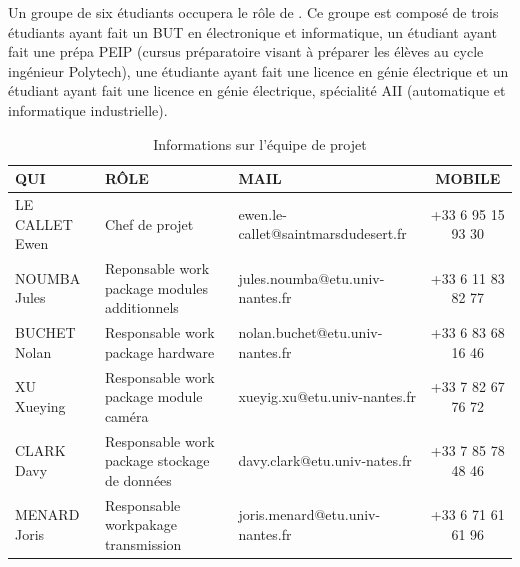\newpage
Un groupe de six étudiants occupera le rôle de .
Ce groupe est composé de trois étudiants ayant fait un BUT en électronique et informatique, un étudiant ayant fait une prépa PEIP (cursus préparatoire visant à préparer les élèves au cycle ingénieur Polytech), une étudiante ayant fait une licence en génie électrique et un étudiant ayant fait une licence en génie électrique, spécialité AII (automatique et informatique industrielle). \\[15pt]

\begin{table}[h!]
    \centering
    \renewcommand{\arraystretch}{1.2} %
    \begin{tabular}{|m{2.5cm}|m{5cm}|m{5cm}|c|}
        \hline
        \textbf{QUI}   & \textbf{RÔLE}                                & \textbf{MAIL}                       & \textbf{MOBILE}   \\
        \hline
        LE CALLET Ewen & Chef de projet                               & ewen.le-callet@saintmarsdudesert.fr & +33 6 95 15 93 30 \\
        \hline
        NOUMBA Jules   & Reponsable work package modules additionnels & jules.noumba@etu.univ-nantes.fr     & +33 6 11 83 82 77 \\
        \hline
        BUCHET Nolan   & Responsable work package hardware            & nolan.buchet@etu.univ-nantes.fr     & +33 6 83 68 16 46 \\
        \hline
        XU Xueying     & Responsable work package module caméra       & xueyig.xu@etu.univ-nantes.fr        & +33 7 82 67 76 72 \\
        \hline
        CLARK Davy     & Responsable work package stockage de données & davy.clark@etu.univ-nates.fr        & +33 7 85 78 48 46 \\
        \hline
        MENARD Joris   & Responsable workpakage transmission          & joris.menard@etu.univ-nantes.fr     & +33 6 71 61 61 96 \\
        \hline
    \end{tabular}
    \caption{Informations sur l'équipe de projet}
    \label{tab:intervenants}
\end{table}